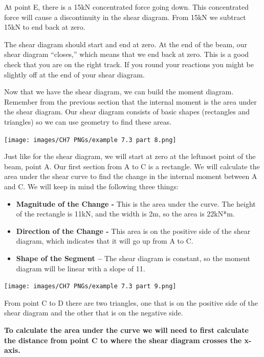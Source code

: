 \documentclass[
  letterpaper,
  DIV=11,
  numbers=noendperiod]{scrreprt}
\begin{document}
\begin{tcolorbox}
At point E, there is a 15kN concentrated force going down. This
concentrated force will cause a discontinuity in the shear diagram. From
15kN we subtract 15kN to end back at zero.

The shear diagram should start and end at zero. At the end of the beam,
our shear diagram ``closes,'' which means that we end back at zero. This
is a good check that you are on the right track. If you round your
reactions you might be slightly off at the end of your shear diagram.

Now that we have the shear diagram, we can build the moment diagram.
Remember from the previous section that the internal moment is the area
under the shear diagram. Our shear diagram consists of basic shapes
(rectangles and triangles) so we can use geometry to find these areas.

\begin{center}
\texttt{[image: images/CH7 PNGs/example 7.3 part 8.png]}
\end{center}

Just like for the shear diagram, we will start at zero at the leftmost
point of the beam, point A. Our first section from A to C is a
rectangle. We will calculate the area under the shear curve to find the
change in the internal moment between A and C. We will keep in mind the
following three things:

\begin{itemize}
\item
  \textbf{Magnitude of the Change -} This is the area under the curve.
  The height of the rectangle is 11kN, and the width is 2m, so the area
  is 22kN*m.
\item
  \textbf{Direction of the Change -} This area is on the positive side
  of the shear diagram, which indicates that it will go up from A to C.
\item
  \textbf{Shape of the Segment --} The shear diagram is constant, so the
  moment diagram will be linear with a slope of 11.
\end{itemize}

\begin{center}
\texttt{[image: images/CH7 PNGs/example 7.3 part 9.png]}
\end{center}

From point C to D there are two triangles, one that is on the positive
side of the shear diagram and the other that is on the negative side.

\textbf{To calculate the area under the curve we will need to first
calculate the distance from point C to where the shear diagram crosses
the x-axis.}


\end{tcolorbox}
\end{document}
